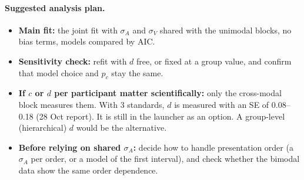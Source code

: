 \documentclass[11pt,a4paper]{article}
\newcommand{\pc}{p_c}
\begin{document}
\paragraph{Suggested analysis plan.}
\begin{itemize}
\item \textbf{Main fit:} the joint fit with $\sigma_A$ and $\sigma_V$ shared with the unimodal blocks, no bias terms, models compared by AIC.
\item \textbf{Sensitivity check:} refit with $d$ free, or fixed at a group value, and confirm that model choice and $\pc$ stay the same.
\item \textbf{If $c$ or $d$ per participant matter scientifically:} only the cross-modal block measures them. With 3 standards, $d$ is measured with an SE of 0.08--0.18 (28 Oct report). It is still in the launcher as an option. A group-level (hierarchical) $d$ would be the alternative.
\item \textbf{Before relying on shared $\sigma_A$:} decide how to handle presentation order (a $\sigma_A$ per order, or a model of the first interval), and check whether the bimodal data show the same order dependence.
\end{itemize}
\end{document}
